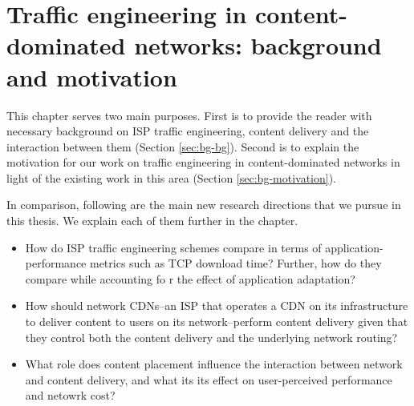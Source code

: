 \chapter{Traffic engineering in content-dominated networks: background and motivation}
\label{ch:te-background}

This chapter serves two main purposes. First is to provide the reader with necessary background on ISP traffic engineering, content delivery and the interaction between them (Section \ref{sec:bg-bg}). Second is to explain the motivation for our work on traffic engineering in content-dominated networks in light of the existing work in this area (Section \ref{sec:bg-motivation}).




In comparison, following are the main new research directions that we pursue in this thesis. We explain each of them further in the chapter.

\begin{itemize}
	\item
	How do ISP traffic engineering schemes compare in terms of application-performance metrics such as TCP download time? Further, how do they compare while accounting fo r the effect of  application adaptation? 
	\item
	How should network CDNs--an ISP that operates a CDN on its infrastructure to deliver content to users on its network--perform content delivery given that they control both the content delivery and the underlying network routing?
	\item
	What role does content placement influence the interaction between network and content delivery, and what its its effect on user-perceived performance and netowrk cost?
\end{itemize}






